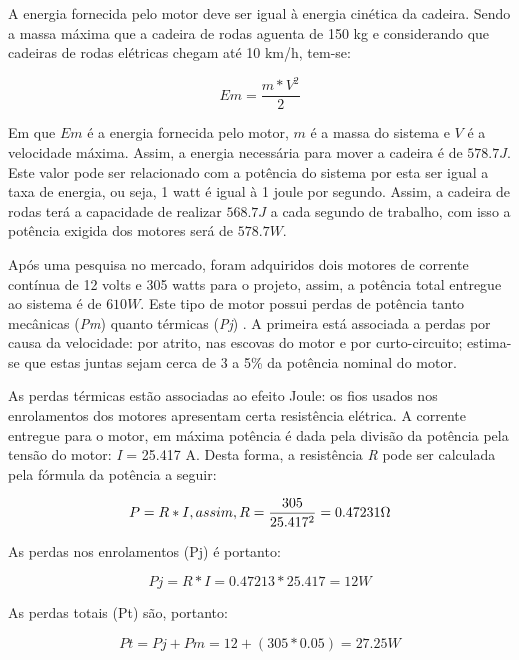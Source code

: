 		A energia fornecida pelo motor deve ser igual à energia cinética da cadeira. Sendo a massa máxima que a cadeira de rodas aguenta de 150 kg e considerando que cadeiras de rodas elétricas chegam até 10 km/h, tem-se:


		\begin{equation}
			Em = \frac{m*V^2}{2}
		\end{equation}

  	Em que $Em$ é a energia fornecida pelo motor, $m$ é a massa do sistema e $V$ é a velocidade máxima. Assim, a energia necessária para mover a cadeira é de $578.7 J$. Este valor pode ser relacionado com a potência do sistema por esta ser igual a taxa de energia, ou seja, 1 watt é igual à 1 joule por segundo. Assim, a cadeira de rodas terá a capacidade de realizar $568.7 J$ a cada segundo de trabalho, com isso a potência exigida dos motores será de $578.7 W$.
		
		Após uma pesquisa no mercado, foram adquiridos dois motores de corrente contínua de 12 volts e 305 watts para o projeto, assim, a potência total entregue ao sistema é de $610 W$. Este tipo de motor possui perdas de potência tanto mecânicas (\textit{Pm}) quanto térmicas (\textit{Pj}) \cite{perdas}. A primeira está associada a perdas por causa da velocidade: por atrito, nas escovas do motor e por curto-circuito; estima-se que estas juntas sejam cerca de 3 a 5\% da potência nominal do motor.

		As perdas térmicas estão associadas ao efeito Joule: os fios usados nos enrolamentos dos motores apresentam certa resistência elétrica. A corrente entregue para o motor, em máxima potência é dada pela divisão da potência pela tensão do motor: \textit{I} = 25.417 A. Desta forma, a resistência \textit{R} pode ser calculada pela fórmula da potência a seguir:

		\begin{equation}
			P = R*I, assim, R = \frac{305}{25.417^2} = 0.47231 \ohm
		\end{equation}

		As perdas nos enrolamentos (Pj) é portanto:

		\begin{equation}
			Pj = R*I = 0.47213*25.417 = 12 W
		\end{equation}

		As perdas totais (Pt) são, portanto:

		\begin{equation}
			Pt = Pj+Pm = 12+(305*0.05) = 27.25 W
		\end{equation}

